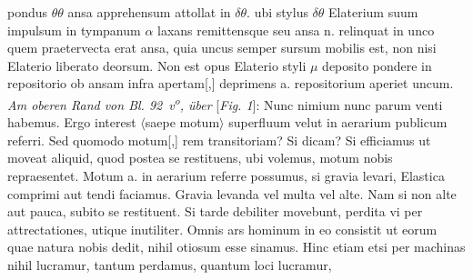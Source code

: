 pondus\protect{} $\displaystyle \theta\theta$ ansa  apprehensum
attollat in $\displaystyle \delta\theta$. ubi stylus $\displaystyle \delta\theta$ Elaterium\protect{}
suum impulsum in tympanum\protect{} $\displaystyle \alpha$ laxans remittensque
seu 
ansa n. %
relinquat in unco 
 quem praetervecta erat ansa,
quia uncus 
 semper sursum mobilis est, non
nisi Elaterio\protect{} liberato deorsum. Non est opus Elaterio\protect{} styli $\displaystyle \mu$ 
deposito pondere\protect{} in repositorio ob ansam infra apertam[,]
deprimens a. %
repositorium aperiet uncum.
\pend
\vspace{2em}
\pstart
\noindent
\textit{Am oberen Rand von Bl. 92~v\textsuperscript{o}, über} [\textit{Fig. 1}]:
\pend
\vspace*{0.5em}
\pstart
\noindent
Nunc nimium nunc parum venti\protect{} habemus.
Ergo interest $\displaystyle\langle$saepe motum$\displaystyle\rangle$ superfluum velut in aerarium publicum referri.
Sed quomodo motum[,] rem transitoriam?
Si dicam?
Si efficiamus ut moveat aliquid,
quod postea se restituens,
ubi volemus,
motum nobis repraesentet.
Motum a. %
in aerarium referre possumus,
si gravia\protect{} levari,
Elastica\protect{} comprimi aut tendi faciamus. Gravia levanda vel multa vel alte.
Nam si non alte aut pauca, subito se restituent.
Si tarde debiliter movebunt, perdita vi per attrectationes, utique inutiliter.
\pend
\pstart
Omnis ars hominum in eo consistit ut eorum quae natura nobis dedit,
nihil otiosum esse sinamus.
Hinc etiam etsi per machinas\protect{}
nihil lucramur,
tantum perdamus, quantum loci lucramur,
